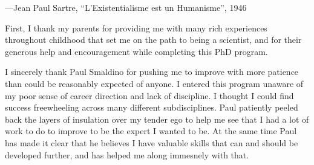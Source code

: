 \documentclass[12pt,chapterheads]{UCMerced}
\begin{document}
\begin{frontmatter}
\begin{epigraph}
  ---Jean Paul Sartre, ``L'Existentialisme est un Humanisme'', 1946
\end{epigraph}

% 

\tableofcontents
\listoffigures  %
\listoftables   %



\begin{acknowledgements} 
First, I thank my parents for providing me with many rich experiences throughout
childhood that set me on the path to being a scientist,
and for their generous help and encouragement while completing this 
PhD program.

I sincerely thank Paul Smaldino for pushing me to improve with 
more patience than could be reasonably expected of anyone. 
I entered this program unaware of my poor
sense of career direction and lack of discipline.
I thought I could find success freewheeling across
many different subdisciplines. Paul patiently peeled back the layers of
insulation over my tender ego to help me see that I had a lot of work to do
to improve to be the expert I wanted to be. At the same time Paul has
made it clear that he believes I have valuable skills that can and
should be developed further, and has helped me along immesnely with that.


\end{acknowledgements}
\end{frontmatter}
\end{document}
